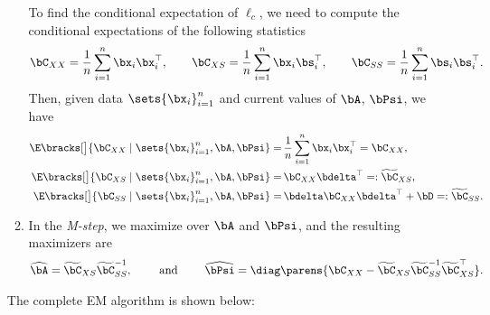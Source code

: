 \documentclass[12pt]{article}
\begin{document}
\begin{enumerate}[label=\textbf{\arabic*.}]
\begin{enumerate}
		To find the conditional expectation of $\ell_c$, we need to compute the conditional expectations of the following statistics 
		\begin{align*}
			\bC_{XX} = \frac{1}{n} \sum_{i=1}^n \bx_i \bx_i^\top, \qquad \bC_{XS} = \frac{1}{n} \sum_{i=1}^n \bx_i \bs_i^\top, \qquad \bC_{SS} = \frac{1}{n} \sum_{i=1}^n \bs_i \bs_i^\top. 
		\end{align*}
		Then, given data $\sets{\bx_i}_{i=1}^n$ and current values of $\bA$, $\bPsi$, we have 
		\begin{align*}
			\E \bracks[\big]{\bC_{XX} \mid \sets{\bx_i}_{i=1}^n, \bA, \bPsi} = & \, \frac{1}{n} \sum_{i=1}^n \bx_i \bx_i^\top = \bC_{XX}, \\ 
			\E \bracks[\big]{\bC_{XS} \mid \sets{\bx_i}_{i=1}^n, \bA, \bPsi} = & \, \bC_{XX} \bdelta^\top =: \widetilde{\bC}_{XS}, \\ 
			\E \bracks[\big]{\bC_{SS} \mid \sets{\bx_i}_{i=1}^n, \bA, \bPsi} = & \, \bdelta \bC_{XX} \bdelta^\top + \bD =: \widetilde{\bC}_{SS}. 
		\end{align*}
		
		\item In the \emph{M-step}, we maximize over $\bA$ and $\bPsi$, and the resulting maximizers are 
		\begin{align*}
			\widehat{\bA} = \widetilde{\bC}_{XS} \widetilde{\bC}_{SS}^{-1}, \qquad \text{ and } \qquad \widehat{\bPsi} = \diag \parens{ \bC_{XX} - \widetilde{\bC}_{XS} \widetilde{\bC}_{SS}^{-1} \widetilde{\bC}_{XS}^\top }. 
		\end{align*}
	\end{enumerate}
	
	The complete EM algorithm is shown below: 
	

\end{enumerate}
\end{document}
